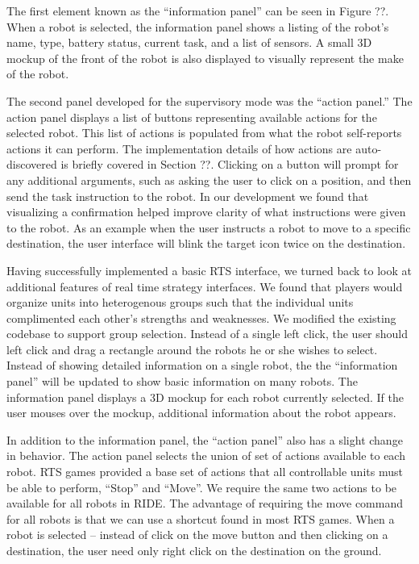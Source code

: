 The first element known as the ``information panel'' can be seen in Figure ??. When a robot is selected, the information panel shows a listing of the robot's name, type, battery status, current task, and a list of sensors. A small 3D mockup of the front of the robot is also displayed to visually represent the make of the robot.

The second panel developed for the supervisory mode was the ``action panel.'' The action panel displays a list of buttons representing available actions for the selected robot. This list of actions is populated from what the robot self-reports actions it can perform. The implementation details of how actions are auto-discovered is briefly covered in Section ??. Clicking on a button will prompt for any additional arguments, such as asking the user to click on a position, and then send the task instruction to the robot. In our development we found that visualizing a confirmation helped improve clarity of what instructions were given to the robot. As an example when the user instructs a robot to move to a specific destination, the user interface will blink the target icon twice on the destination.  

Having successfully implemented a basic RTS interface, we turned back to look at additional features of real time strategy interfaces. We found that players would organize units into heterogenous groups such that the individual units complimented each other's strengths and weaknesses. We modified the existing codebase to support group selection. Instead of a single left click, the user should left click and drag a rectangle around the robots he or she wishes to select. Instead of showing detailed information on a single robot, the the ``information panel'' will be updated to show basic information on many robots. The information panel displays a 3D mockup for each robot currently selected. If the user mouses over the mockup, additional information about the robot appears.

In addition to the information panel, the ``action panel'' also has a slight change in behavior. The action panel selects the union of set of actions available to each robot. RTS games provided a base set of actions that all controllable units must be able to perform, ``Stop'' and ``Move''. We require the same two actions to be available for all robots in RIDE. The advantage of requiring the move command for all robots is that we can use a shortcut found in most RTS games. When a robot is selected -- instead of click on the move button and then clicking on a destination, the user need only right click on the destination on the ground.

